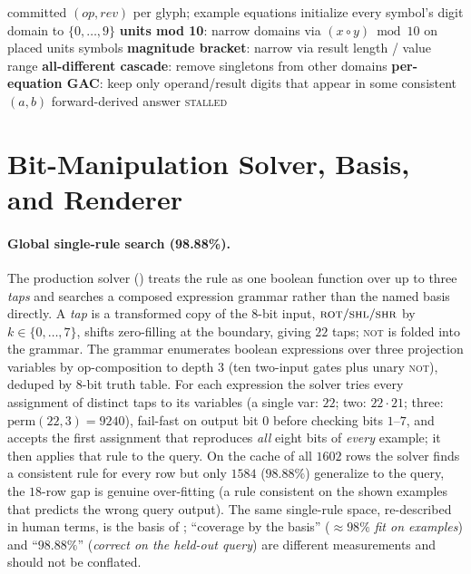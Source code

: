 \documentclass[11pt]{article}
\begin{document}
\begin{algorithm}[htbp]
\caption{\textsc{Cryptarithm-forward}, the imitable forward closure ($\approx\!1/659$ coverage)}
\label{alg:cryptfwd}
\begin{algorithmic}[1]
\Require committed $(\mathit{op},\mathit{rev})$ per glyph; example equations
\State initialize every symbol's digit domain to $\{0,\dots,9\}$ 
\Repeat
  \State \textbf{units mod 10}: narrow domains via $(x\circ y)\bmod 10$ on placed units symbols
  \State \textbf{magnitude bracket}: narrow via result length / value range
  \State \textbf{all-different cascade}: remove singletons from other domains
  \State \textbf{per-equation GAC}: keep only operand/result digits that appear in some consistent $(a,b)$
 \Return forward-derived answer
\Else{} \Return \textsc{stalled} 
\EndIf
\end{algorithmic}
\end{algorithm}

\section{Bit-Manipulation Solver, Basis, and Renderer}
\label{app:bit}

\paragraph{Global single-rule search (98.88\%).} The production solver
() treats the rule as one boolean function over up to three
\emph{taps} and searches a composed expression grammar rather than the named basis directly.
A \emph{tap} is a transformed copy of the 8-bit input, $\textsc{rot}/\textsc{shl}/\textsc{shr}$
by $k\in\{0,\dots,7\}$, shifts zero-filling at the boundary, giving $22$ taps; \textsc{not}
is folded into the grammar. The grammar enumerates boolean expressions over three projection
variables by op-composition to depth $3$ (ten two-input gates plus unary \textsc{not}),
deduped by 8-bit truth table. For each expression the solver tries every assignment of
distinct taps to its variables (a single var: $22$; two: $22\!\cdot\!21$; three:
$\mathrm{perm}(22,3)=9240$), fail-fast on output bit $0$ before checking bits $1$--$7$, and
accepts the first assignment that reproduces \emph{all} eight bits of \emph{every} example;
it then applies that rule to the query. On the cache of all $1602$ rows the solver finds a
consistent rule for every row but only $1584$ ($98.88\%$) generalize to the query, the
$18$-row gap is genuine over-fitting (a rule consistent on the shown examples that predicts
the wrong query output). The same single-rule space, re-described in human terms, is the
basis of ; ``coverage by the basis'' ($\approx\!98\%$ \emph{fit on examples})
and ``$98.88\%$'' (\emph{correct on the held-out query}) are different measurements and
should not be conflated.
\end{document}

